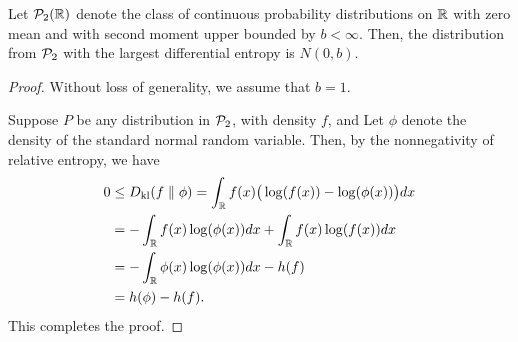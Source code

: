             \begin{proposition}
                \label{prop:max-ent-1} Let $\mathcal{P}_2(\mathbb{R})$ denote the class of continuous probability distributions on $\mathbb{R}$ with zero mean and with second moment upper bounded by $b<\infty$. Then, the distribution from $\mathcal{P}_2$ with the largest differential entropy is $N(0, b)$. 
            \end{proposition}
            \begin{proof}
                Without loss of generality, we assume that $b=1$. 
                
                Suppose $P$ be any distribution in $\mathcal{P}_2$, with density $f$, and Let $\phi$ denote the density of the standard normal random variable. Then, by the nonnegativity of relative entropy, we have 
                \begin{align}
                    0 & \leq D_{\text{kl}}(f \parallel \phi)  = \int_{\mathbb{R}} f(x) \big(\log(f(x))  - \log(\phi(x)) \big) dx \\
                    & = -\int_{\mathbb{R}} f(x) \log(\phi(x)) dx + \int_{\mathbb{R}} f(x) \log(f(x)) dx \\
                    & = -\int_{\mathbb{R}} \phi(x) \log(\phi(x)) dx - h(f) \\
                    & = h(\phi) - h(f). 
                \end{align}
                This completes the proof.
            \end{proof}

